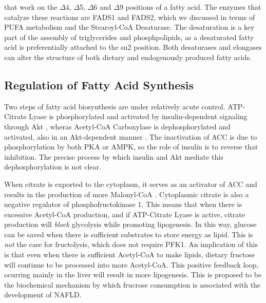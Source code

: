 \documentclass{tufte-handout}
\begin{document}
 that work on the $\Delta$4, $\Delta$5, $\Delta$6 and $\Delta$9 positions of a fatty acid.  The enzymes that catalyze these reactions are FADS1 and FADS2, which we discussed in terms of PUFA metabolism and the Stearoyl-CoA Desaturase.  The desaturation is a key part of the assembly of triglycerides and phosphpolipids, as a desaturated fatty acid is preferentially attached to the sn2 position.  Both desaturases and elongases can alter the structure of both dietary and endogenously produced fatty acids.

\subsection{Regulation of Fatty Acid Synthesis}

Two steps of fatty acid biosynthesis are under relatively acute control.  ATP-Citrate Lyase is phosphorylated and activated by insulin-dependent signaling through Akt \citep{Berwick2002}, wheras Acetyl-CoA Carboxylase is dephosphorylated and activated, also in an Akt-dependent manner \citep{Witters1992}.  The inactivation of ACC is due to phosphorylation by both PKA or AMPK, so the role of insulin is to reverse that inhibition.  The precise process by which insulin and Akt mediate this dephosphorylation is not clear.  

  When citrate is exported to the cytoplasm, it serves as an activator of ACC and results in the production of more Malonyl-CoA \citep{VAGELOS1963}.  Cytoplasmic citrate is also a negative regulator of phosphofructokinase 1.  This means that when there is excessive Acetyl-CoA production, and if ATP-Citrate Lyase is active, citrate production will \emph{block} glycolysis while promoting lipogenesis.  In this way, glucose can be saved when there is sufficient substrates to store energy as lipid.  This is \emph{not} the case for fructolysis, which does not require PFK1.  An implication of this is that even when there is sufficient Acetyl-CoA to make lipids, dietary fructose will continue to be processed into more Acetyl-CoA.  This positive feedback loop, ocurring mainly in the liver will result in more lipogenesis.  This is proposed to be the biochemical mechanism by which frucrose consumption is associated with the development of NAFLD\citep{Lim2010}.
\end{document}

